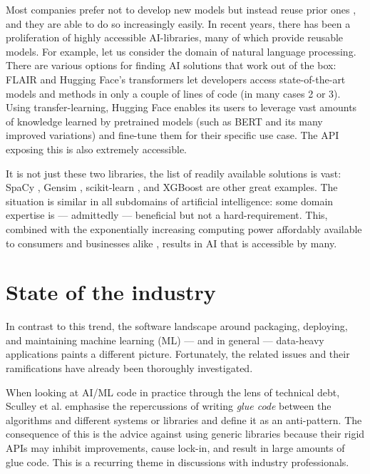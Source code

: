 Most companies prefer not to develop new models but instead reuse prior ones \cite{bosch2021engineering}, and they are able to do so increasingly easily. In recent years, there has been a proliferation of highly accessible AI-libraries, many of which provide reusable models. For example, let us consider the domain of natural language processing. There are various options for finding AI solutions that work out of the box: FLAIR \cite{akbik2019flair} and Hugging Face's transformers \cite{wolf2019huggingface} let developers access state-of-the-art models and methods in only a couple of lines of code (in many cases 2 or 3). Using transfer-learning, Hugging Face enables its users to leverage vast amounts of knowledge learned by pretrained models (such as BERT \cite{devlin2018bert} and its many improved variations) and fine-tune them for their specific use case. The API exposing this is also extremely accessible.

It is not just these two libraries, the list of readily available solutions is vast: SpaCy \cite{srinivasa2018natural}, Gensim \cite{vrehuuvrek2011gensim}, scikit-learn \cite{pedregosa2011scikit}, and XGBoost \cite{Chen_2016} are other great examples. The situation is similar in all subdomains of artificial intelligence: some domain expertise is --- admittedly --- beneficial but not a hard-requirement. This, combined with the exponentially increasing computing power affordably available to consumers and businesses alike \cite{sun2019summarizing}, results in AI that is accessible by many.

\section{State of the industry} \label{section:industry}

In contrast to this trend, the software landscape around packaging, deploying, and maintaining machine learning (ML) --- and in general --- data-heavy applications paints a different picture. Fortunately, the related issues and their ramifications have already been thoroughly investigated.

When looking at AI/ML code in practice through the lens of technical debt, Sculley et al. \cite{sculley2015hidden} emphasise the repercussions of writing \textit{glue code} between the algorithms and different systems or libraries and define it as an anti-pattern. The consequence of this is the advice against using generic libraries because their rigid APIs may inhibit improvements, cause lock-in, and result in large amounts of glue code. This is a recurring theme in discussions with industry professionals.

